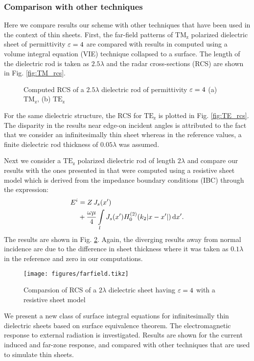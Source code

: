 \documentclass[12pt]{article}
\begin{document}
\subsubsection{Comparison with other techniques}
%
Here we compare results our scheme with other techniques that have been used in the context of thin sheets. First, the far-field patterns of $\mathrm{TM_z}$ polarized dielectric sheet of permittivity $\varepsilon = 4$ are compared with results in \cite{Richmond1965} computed using a volume integral equation (VIE) technique collapsed to a surface. The length of the dielectric rod is taken as $2.5 \lambda$ and the radar cross-sections (RCS) are shown in Fig. \ref{fig:TM_rcs}.
%
\begin{figure}[!htbp]
  \centering
  \caption{Computed RCS of a $2.5 \lambda$ dielectric rod of permittivity $\varepsilon=4$ (a) $\mathrm{TM_z}$, (b) $\mathrm{TE_z}$}
  \label{fig:RCS_richmodn}
\end{figure}
%
For the same dielectric structure, the RCS for $\mathrm{TE_z}$ is plotted in Fig. \ref{fig:TE_rcs}. The disparity in the results near edge-on incident angles is attributed to the fact that we consider an infinitesimally thin sheet whereas in the reference values, a finite dielectric rod thickness of $0.05 \lambda$ was assumed.

Next we consider a $\mathrm{TE_z}$ polarized dielectric rod of length $2 \lambda$ and compare our results with the ones presented in \cite{Senior_1987} that were computed using a resistive sheet model which is derived from the impedance boundary conditions (IBC) through the expression:
%
\begin{equation}
  \begin{split}
    E^i &= Z \, J_s(x') \\
    & + \frac{\omega \mu}{4}  \int\limits_{l} J_s(x')  H_0^{(2)}(k_2 |x - x'|) \mathop{}\!\mathrm{d}{x'}.
  \end{split}
  \label{eq:IBC_senior}
\end{equation}
%
The results are shown in Fig. \ref{fig:senior_rcs}. Again, the diverging results away from normal incidence are due to the difference in sheet thickness where it was taken as $0.1 \lambda$ in the reference and zero in our computations.
%
\begin{figure}
  \centering
  \texttt{[image: figures/farfield.tikz]}
  \caption{Comparsion of RCS of a $2 \lambda$ dielectric sheet having $\varepsilon=4$ with a resistive sheet model}
  \label{fig:senior_rcs}
\end{figure}
%
%
%
We present a new class of surface integral equations for infinitesimally thin dielectric sheets based on surface equivalence theorem. The electromagnetic response to external radiation is investigated. Results are shown for the current induced and far-zone response, and compared with other techniques that are used to simulate thin sheets.

\clearpage %
% 


\end{document}
